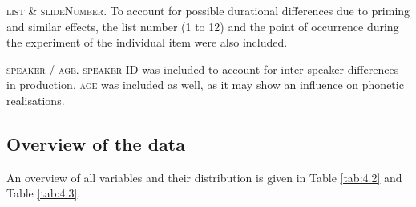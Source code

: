 \textsc{list} \& \textsc{slideNumber}. To account for possible durational differences due to priming and similar effects, the list number (1 to 12) and the point of occurrence during the experiment of the individual item were also included.

\textsc{speaker} / \textsc{age}. \textsc{speaker} ID was included to account for inter-speaker differences in production. \textsc{age} was included as well, as it may show an influence on phonetic realisations.

\subsection{Overview of the data}\label{section04_2_2}

An overview of all variables and their distribution is given in Table \ref{tab:4.2} and Table \ref{tab:4.3}.

